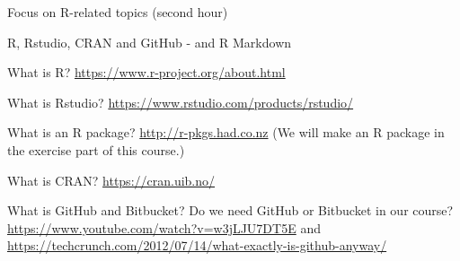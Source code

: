 \documentclass[
  ignorenonframetext,
]{beamer}
\begin{document}
\begin{frame}
\begin{block}{Focus on R-related topics (second hour)}
\label{focus-on-r-related-topics-second-hour}
\end{block}

\begin{block}{R, Rstudio, CRAN and GitHub - and R Markdown}
\label{r-rstudio-cran-and-github---and-r-markdown}
\begin{block}{What is R?}
\label{what-is-r}
\url{https://www.r-project.org/about.html}
\end{block}

\begin{block}{What is Rstudio?}
\label{what-is-rstudio}
\url{https://www.rstudio.com/products/rstudio/}
\end{block}

\begin{block}{What is an R package?}
\label{what-is-an-r-package}
\url{http://r-pkgs.had.co.nz} (We will make an R package in the exercise
part of this course.)
\end{block}

\begin{block}{What is CRAN?}
\label{what-is-cran}
\url{https://cran.uib.no/}
\end{block}

\begin{block}{What is GitHub and Bitbucket?}
\label{what-is-github-and-bitbucket}
Do we need GitHub or Bitbucket in our course?
\url{https://www.youtube.com/watch?v=w3jLJU7DT5E} and
\url{https://techcrunch.com/2012/07/14/what-exactly-is-github-anyway/}
\end{block}
\end{block}
\end{frame}
\end{document}
